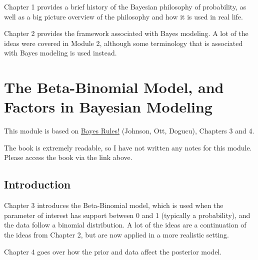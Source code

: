 \documentclass[
]{book}
\begin{document}
Chapter 1 provides a brief history of the Bayesian philosophy of probability, as well as a big picture overview of the philosophy and how it is used in real life.

Chapter 2 provides the framework associated with Bayes modeling. A lot of the ideas were covered in Module 2, although some terminology that is associated with Bayes modeling is used instead.

\hypertarget{the-beta-binomial-model-and-factors-in-bayesian-modeling}{%
\chapter{The Beta-Binomial Model, and Factors in Bayesian Modeling}\label{the-beta-binomial-model-and-factors-in-bayesian-modeling}}

This module is based on \href{https://www.bayesrulesbook.com/}{Bayes Rules!} (Johnson, Ott, Dogucu), Chapters 3 and 4.

The book is extremely readable, so I have not written any notes for this module. Please access the book via the link above.

\hypertarget{introduction-8}{%
\section{Introduction}\label{introduction-8}}

Chapter 3 introduces the Beta-Binomial model, which is used when the parameter of interest has support between 0 and 1 (typically a probability), and the data follow a binomial distribution. A lot of the ideas are a continuation of the ideas from Chapter 2, but are now applied in a more realistic setting.

Chapter 4 goes over how the prior and data affect the posterior model.

  
\end{document}
